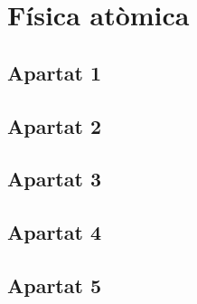 \section{Física atòmica}
\subsection{Apartat 1}

\subsection{Apartat 2}

\subsection{Apartat 3}

\subsection{Apartat 4}

\subsection{Apartat 5}